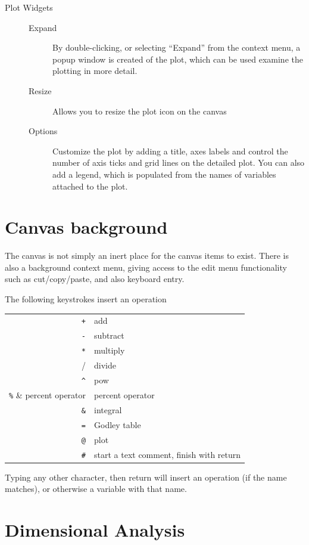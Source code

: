 \begin{description}
\item[Plot Widgets]\mbox{}
\begin{description}
\item[Expand]
By double-clicking, or selecting ``Expand'' from the context menu, a
popup window is created of the plot, which can be used examine the
plotting in more detail.

\item[Resize] Allows you to resize the plot icon on the canvas
\item[Options] Customize the plot by adding a title, axes labels and
  control the number of axis ticks and grid lines on the detailed
  plot. You can also add a legend, which is populated from the names
  of variables attached to the plot.
\end{description}

\end{description}

\section{Canvas background}

The canvas is not simply an inert place for the canvas items to
exist. There is also a background context menu, giving access to the
edit menu functionality such as cut/copy/paste, and also keyboard entry.

The following keystrokes insert an operation

\begin{tabular}{rl}
  \verb-+- & add\\
  \verb+-+ & subtract \\
  \verb+*+ & multiply\\
  \verb++/ & divide\\
  \verb+^+ & pow\\
  \verb+%+ & percent operator\\
  \verb+&+ & integral\\
  \verb+=+ & Godley table\\
  \verb+@+ & plot\\
  \verb+#+ & start a text comment, finish with return\\
\end{tabular}

Typing any other character, then return will insert an operation (if
the name matches), or otherwise a variable with that name.

\section{Dimensional Analysis}

